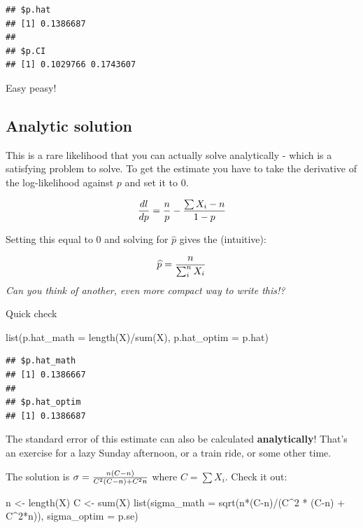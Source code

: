 \documentclass[]{tufte-handout}
\newenvironment{Shaded}{}{}
\newcommand{\AttributeTok}[1]{\textcolor[rgb]{0.49,0.56,0.16}{#1}}
\newcommand{\DecValTok}[1]{\textcolor[rgb]{0.25,0.63,0.44}{#1}}
\newcommand{\FunctionTok}[1]{\textcolor[rgb]{0.02,0.16,0.49}{#1}}
\newcommand{\NormalTok}[1]{#1}
\newcommand{\OtherTok}[1]{\textcolor[rgb]{0.00,0.44,0.13}{#1}}
\newcommand{\SpecialCharTok}[1]{\textcolor[rgb]{0.25,0.44,0.63}{#1}}
\begin{document}
\begin{verbatim}
## $p.hat
## [1] 0.1386687
## 
## $p.CI
## [1] 0.1029766 0.1743607
\end{verbatim}

Easy peasy!

\subsection{Analytic solution}\label{analytic-solution}

This is a rare likelihood that you can actually solve analytically -
which is a satisfying problem to solve. To get the estimate you have to
take the derivative of the log-likelihood against \(p\) and set it to 0.

\[{dl \over dp} = {n \over p} - {\sum X_i - n \over 1-p}\]

Setting this equal to 0 and solving for \(\widehat{p}\) gives the
(intuitive):

\[\widehat{p} = {n \over \sum_i^n X_i}\] \emph{Can you think of another,
even more compact way to write this!?}

Quick check

\begin{Shaded}
\begin{Highlighting}[]
\FunctionTok{list}\NormalTok{(}\AttributeTok{p.hat\_math =} \FunctionTok{length}\NormalTok{(X)}\SpecialCharTok{/}\FunctionTok{sum}\NormalTok{(X), }
     \AttributeTok{p.hat\_optim =}\NormalTok{ p.hat)}
\end{Highlighting}
\end{Shaded}

\begin{verbatim}
## $p.hat_math
## [1] 0.1386667
## 
## $p.hat_optim
## [1] 0.1386687
\end{verbatim}

The standard error of this estimate can also be calculated
\textbf{analytically}! That's an exercise for a lazy Sunday afternoon,
or a train ride, or some other time.

The solution is \(\sigma = {n(C-n) \over C^2(C-n) + C^2n}\) where
\(C = \sum X_i\). Check it out:

\begin{Shaded}
\begin{Highlighting}[]
\NormalTok{n }\OtherTok{\textless{}{-}} \FunctionTok{length}\NormalTok{(X)}
\NormalTok{C }\OtherTok{\textless{}{-}} \FunctionTok{sum}\NormalTok{(X)}
\FunctionTok{list}\NormalTok{(}\AttributeTok{sigma\_math =} \FunctionTok{sqrt}\NormalTok{(n}\SpecialCharTok{*}\NormalTok{(C}\SpecialCharTok{{-}}\NormalTok{n)}\SpecialCharTok{/}\NormalTok{(C}\SpecialCharTok{\^{}}\DecValTok{2} \SpecialCharTok{*}\NormalTok{ (C}\SpecialCharTok{{-}}\NormalTok{n) }\SpecialCharTok{+}\NormalTok{ C}\SpecialCharTok{\^{}}\DecValTok{2}\SpecialCharTok{*}\NormalTok{n)), }
     \AttributeTok{sigma\_optim =}\NormalTok{ p.se)}
\end{Highlighting}
\end{Shaded}
\end{document}
